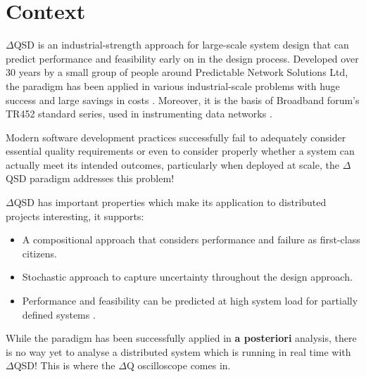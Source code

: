 \section{Context}
    $\Delta$QSD is an industrial-strength approach for large-scale system design that can predict performance and feasibility early on in the design process.  
    Developed over 30 years by a small group of people around Predictable Network Solutions Ltd, the paradigm has been applied in various industrial-scale problems with huge success and large savings in costs \cite{dq-tut}. Moreover, it is the basis of Broadband forum's TR452 standard series, used in instrumenting data networks \cite{dq-br}.

    Modern software development practices successfully fail to adequately consider essential quality requirements or even to consider properly whether a system can actually meet its intended outcomes, particularly when deployed at scale, the $\Delta$QSD paradigm addresses this problem! \cite{art} 

       $\Delta$QSD has important properties which make its application to distributed projects interesting, it supports:
    \begin{itemize}
        \item A compositional approach that considers performance and failure as first-class citizens. 
        \item Stochastic approach to capture uncertainty throughout the design approach.
        \item Performance and feasibility can be predicted at high system load for partially defined systems \cite{dq-tut}.
    \end{itemize}
    
    While the paradigm has been successfully applied in \textbf{a posteriori} analysis, there is no way yet to analyse a distributed system which is running in real time with $\Delta$QSD! This is where the $\Delta$Q oscilloscope comes in. 
